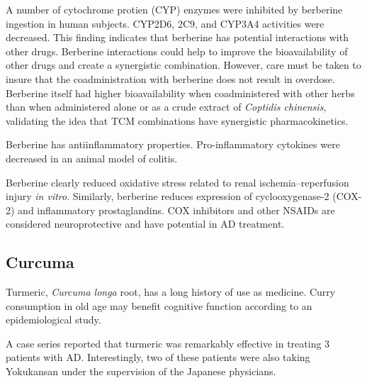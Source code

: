 \documentclass[twocolumn]{article}
\begin{document}
A number of cytochrome protien (CYP) enzymes were inhibited
by berberine ingestion in human subjects.
CYP2D6, 2C9, and CYP3A4 activities were decreased.
\cite{guo2012repeated}
This finding indicates that berberine has potential interactions with
other drugs. Berberine interactions could help to improve the
bioavailability of other drugs and create a synergistic
combination. However, care must be taken to insure that
the coadministration with berberine does not result in overdose.
Berberine itself had higher bioavailability when
coadministered with other herbs than when administered alone
or as a crude extract of \textit{Coptidis chinensis},
validating the idea that TCM combinations
have synergistic pharmacokinetics.
\cite{chen2013comparative}



Berberine has antiinflammatory properties.
Pro-inflammatory cytokines were decreased in an animal model of colitis.
\cite{yan2012berberine}

Berberine clearly reduced oxidative stress
related to renal ischemia–reperfusion injury
\textit{in vitro}.
\cite{yu2013berberine}
Similarly, berberine reduces expression of cyclooxygenase-2 (COX-2)
and inflammatory prostaglandins.
\cite{singh2011berberine}
COX inhibitors and other NSAIDs are considered neuroprotective
and have potential in AD treatment.
\cite{hoozemans2005role}







\subsection{Curcuma}

Turmeric, \textit{Curcuma longa} root, has a long history of use as medicine.
\cite{?}
Curry consumption in old age may benefit cognitive function
according to an epidemiological study.
\cite{ng2006curry}

A case series reported that turmeric was remarkably effective
in treating 3 patients with AD.
Interestingly, two of these patients were also taking
Yokukansan under the supervision of the Japanese physicians.
\cite{hishikawa2012effects}




\end{document}
